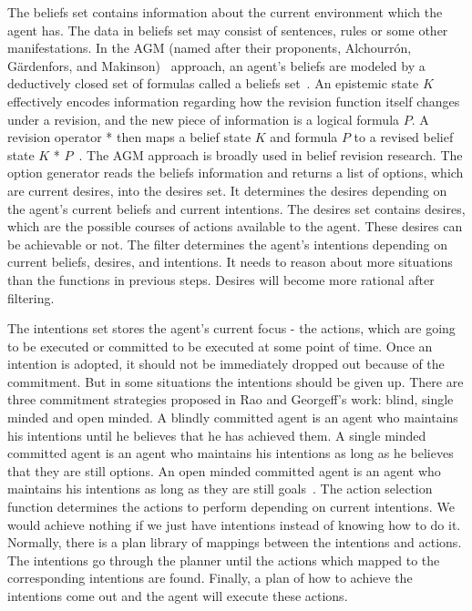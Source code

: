 The beliefs set contains information about the current environment which the agent has.
The data in beliefs set may consist of sentences, rules or some other manifestations.
In the AGM (named after their proponents, Alchourrón, Gärdenfors, and Makinson)~\cite{alchourron_revision_1985} approach, an agent's beliefs are modeled by a deductively closed set of formulas called a beliefs set~\cite{James_revise_2011}.
An epistemic state $K$ effectively encodes information regarding how the revision function itself changes under a revision, and the new piece of information is a logical formula $P$.
A revision operator * then maps a belief state $K$ and formula $P$ to a revised belief state $K$ * $P$~\cite{James_revise_2011}.
The AGM approach is broadly used in belief revision research.
The option generator reads the beliefs information and returns a list of options, which are current desires, into the desires set.
It determines the desires depending on the agent's current beliefs and current intentions.
The desires set contains desires, which are the possible courses of actions available to the agent.
These desires can be achievable or not.
The filter determines the agent's intentions depending on current beliefs, desires, and intentions.
It needs to reason about more situations than the functions in previous steps.
Desires will become more rational after filtering.

The intentions set stores the agent's current focus - the actions, which are going to be executed or committed to be executed at some point of time.
Once an intention is adopted, it should not be immediately dropped out because of the commitment.
But in some situations the intentions should be given up.
There are three commitment strategies proposed in Rao and Georgeff's work: blind, single minded and open minded.
A blindly committed agent is an agent who maintains his intentions until he believes that he has achieved them.
A single minded committed agent is an agent who maintains his intentions as long as he believes that they are still options.
An open minded committed agent is an agent who maintains his intentions as long as they are still goals~\cite{Roberto_BDIATL_2005}.
The action selection function determines the actions to perform depending on current intentions.
We would achieve nothing if we just have intentions instead of knowing how to do it.
Normally, there is a plan library of mappings between the intentions and actions.
The intentions go through the planner until the actions which mapped to the corresponding intentions are found.
Finally, a plan of how to achieve the intentions come out and the agent will execute these actions.

